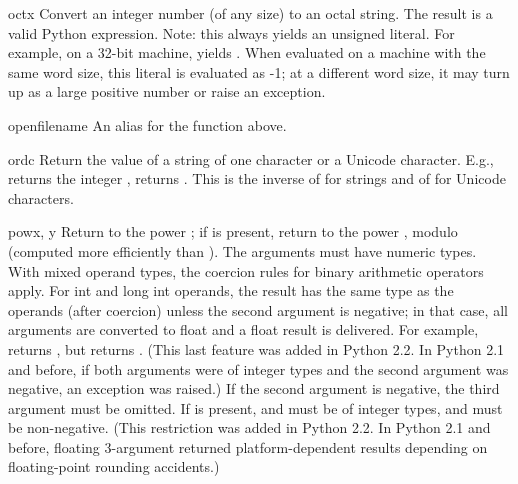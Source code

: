 \begin{funcdesc}{oct}{x}
  Convert an integer number (of any size) to an octal string.  The
  result is a valid Python expression.  Note: this always yields an
  unsigned literal.  For example, on a 32-bit machine, 
  yields .  When evaluated on a machine with the
  same word size, this literal is evaluated as -1; at a different word
  size, it may turn up as a large positive number or raise an
   exception.
\end{funcdesc}

\begin{funcdesc}{open}{filename}
  An alias for the  function above.
\end{funcdesc}

\begin{funcdesc}{ord}{c}
  Return the \ASCII{} value of a string of one character or a Unicode
  character.  E.g.,  returns the integer ,
   returns .  This is the inverse of
   for strings and of  for Unicode
  characters.
\end{funcdesc}

\begin{funcdesc}{pow}{x, y}
  Return  to the power ; if  is present, return
   to the power , modulo  (computed more
  efficiently than ).  The
  arguments must have numeric types.  With mixed operand types, the
  coercion rules for binary arithmetic operators apply.  For int and
  long int operands, the result has the same type as the operands
  (after coercion) unless the second argument is negative; in that
  case, all arguments are converted to float and a float result is
  delivered.  For example,  returns , but
   returns .  (This last feature was added in
  Python 2.2.  In Python 2.1 and before, if both arguments were of integer
  types and the second argument was negative, an exception was raised.)
  If the second argument is negative, the third argument must be omitted.
  If  is present,  and  must be of integer types,
  and  must be non-negative.  (This restriction was added in
  Python 2.2.  In Python 2.1 and before, floating 3-argument 
  returned platform-dependent results depending on floating-point
  rounding accidents.)
\end{funcdesc}


